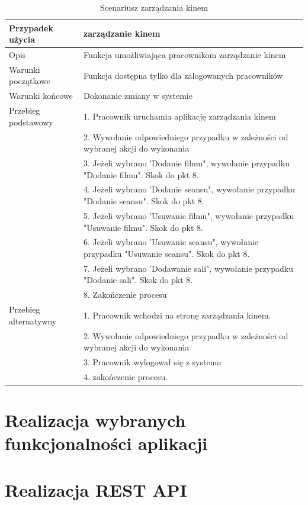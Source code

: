 \begin{table}[H]
	\begin{tabularx}{\textwidth}{ |l|X| }
		\hline 
		Przypadek użycia & zarządzanie kinem  \\ 
		\hline 
		Opis & Funkcja umożliwiająca pracownikom zarządzanie kinem \\ 
		\hline 
		Warunki początkowe & Funkcja dostępna tylko dla zalogowanych pracowników \\ 
		\hline 
		Warunki końcowe & Dokonanie zmiany w systemie  \\ 
		\hline 
		Przebieg podstawowy & 1. Pracownik uruchamia aplikację zarządzania kinem \\ 
		& 2. Wywołanie odpowiedniego przypadku w zależności od wybranej akcji do wykonania \\
		& 3. Jeżeli wybrano 'Dodanie filmu", wywołanie przypadku "Dodanie filmu". Skok do pkt 8. \\
		& 4. Jeżeli wybrano 'Dodanie seansu", wywołanie przypadku "Dodanie seansu". Skok do pkt 8. \\
		& 5. Jeżeli wybrano 'Usuwanie filmu", wywołanie przypadku "Usuwanie filmu". Skok do pkt 8. \\
		& 6. Jeżeli wybrano 'Usuwanie seansu", wywołanie przypadku "Usuwanie seansu". Skok do pkt 8. \\
		& 7. Jeżeli wybrano 'Dodawanie sali", wywołanie przypadku "Dodanie sali". Skok do pkt 8. \\
		& 8. Zakończenie procesu \\
		\hline
		Przebieg alternatywny & 1. Pracownik wchodzi na stronę zarządzania kinem. \\
		& 2. Wywołanie odpowiedniego przypadku w zależności od wybranej akcji do wykonania \\
		& 3. Pracownik wylogował się z systemu \\
		& 4. zakończenie procesu. \\
		\hline 
	\end{tabularx} 
	\caption{Scenariusz zarządzania kinem}
	\label{tab:scen3}   
\end{table}


\section{Realizacja wybranych funkcjonalności aplikacji}
\lssetdef



\section{Realizacja REST API}


